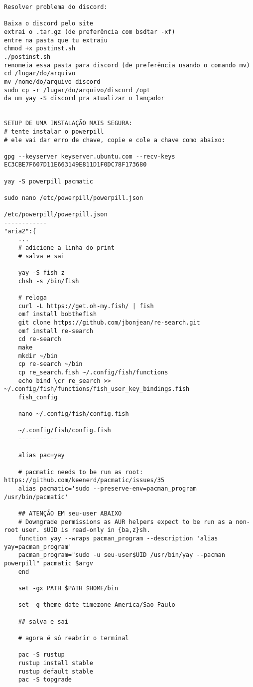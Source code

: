 \documentclass[dark, index]{Iart}
\begin{document}
\begin{lstlisting}
Resolver problema do discord:

Baixa o discord pelo site
extrai o .tar.gz (de preferência com bsdtar -xf)
entre na pasta que tu extraiu
chmod +x postinst.sh
./postinst.sh
renomeia essa pasta para discord (de preferência usando o comando mv)
cd /lugar/do/arquivo
mv /nome/do/arquivo discord
sudo cp -r /lugar/do/arquivo/discord /opt
da um yay -S discord pra atualizar o lançador


SETUP DE UMA INSTALAÇÃO MAIS SEGURA:
# tente instalar o powerpill
# ele vai dar erro de chave, copie e cole a chave como abaixo:

gpg --keyserver keyserver.ubuntu.com --recv-keys EC3CBE7F607D11E663149E811D1F0DC78F173680

yay -S powerpill pacmatic

sudo nano /etc/powerpill/powerpill.json

/etc/powerpill/powerpill.json
------------
"aria2":{
	...
	# adicione a linha do print 
	# salva e sai
	
	yay -S fish z
	chsh -s /bin/fish
	
	# reloga
	curl -L https://get.oh-my.fish/ | fish
	omf install bobthefish
	git clone https://github.com/jbonjean/re-search.git
	omf install re-search
	cd re-search
	make
	mkdir ~/bin
	cp re-search ~/bin
	cp re_search.fish ~/.config/fish/functions
	echo bind \cr re_search >> ~/.config/fish/functions/fish_user_key_bindings.fish
	fish_config
	
	nano ~/.config/fish/config.fish 
	
	~/.config/fish/config.fish
	-----------
	
	alias pac=yay
	
	# pacmatic needs to be run as root: https://github.com/keenerd/pacmatic/issues/35
	alias pacmatic='sudo --preserve-env=pacman_program /usr/bin/pacmatic'
	
	## ATENÇÃO EM seu-user ABAIXO
	# Downgrade permissions as AUR helpers expect to be run as a non-root user. $UID is read-only in {ba,z}sh.
	function yay --wraps pacman_program --description 'alias yay=pacman_program'
	pacman_program="sudo -u seu-user$UID /usr/bin/yay --pacman powerpill" pacmatic $argv
	end
	
	set -gx PATH $PATH $HOME/bin
	
	set -g theme_date_timezone America/Sao_Paulo
	
	## salva e sai
	
	# agora é só reabrir o terminal
	
	pac -S rustup
	rustup install stable
	rustup default stable
	pac -S topgrade
	

\end{lstlisting}
\end{document}
